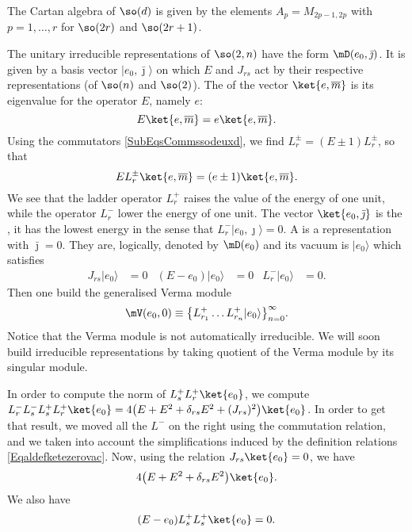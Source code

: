 The Cartan algebra of $\so(d)$ is given by the elements $A_p=M_{2p-1,2p}$ with $p=1,\ldots, r$ for $\so(2r)$ and $\so(2r+1)$. 

The unitary irreducible representations of $\so(2,n)$ have the form $\mD(e_0,\bar\jmath)$. It is given by a basis vector $| e_0,\bar\jmath \rangle$ on which $E$ and $J_{rs}$ act by their respective representations (of $\so(n)$ and $\so(2)$). The  of the vector $\ket{e,\overline{ m }}$ is its eigenvalue for the operator $E$, namely $e$:
\begin{equation}
	E\ket{e,\overline{ m }}=e\ket{e,\overline{ m }}.
\end{equation}
Using the commutators \eqref{SubEqsCommssodeuxd}, we find $L_r^{\pm}=(E\pm 1)L_r^{\pm}$, so that
\begin{equation}
	E L^{\pm}_r\ket{e,\overline{ m }} =(e\pm 1)\ket{e,\overline{ m }}.
\end{equation}
We see that the ladder operator $L_r^+$ raises the value of the energy of one unit, while the operator $L_r^-$ lower the energy of one unit. The vector $\ket{e_0,\bar\jmath}$ is the , it has the lowest energy in the sense that $L^{-}_r| e_0,\jmath \rangle=0$. A  is a representation with $\bar\jmath=0$. They are, logically, denoted by $\mD(e_0)$ and its vacuum is $| e_0 \rangle$ which satisfies
\begin{align}		\label{Eqaldefketezerovac}
	J_{rs}| e_0 \rangle & = 0	& (E-e_0)| e_0 \rangle&=0	&L_r^{-}| e_0 \rangle&=0.
\end{align}
Then one build the generalised Verma module
\begin{equation}	\label{EqmVVermaldots}
	\mV(e_0,0)\equiv \big\{   L_{r_1}^+\ldots L_{r_n}^+| e_0 \rangle   \big\}_{n=0}^{\infty}.
\end{equation}
Notice that the Verma module is not automatically irreducible. We will soon build irreducible representations by taking quotient of the Verma module by its singular module.

In order to compute the norm of $L_s^+L_r^+\ket{e_0}$, we compute $L^-_rL^-_sL^+_sL^+_r\ket{e_0} =4\big(E+E^2+\delta_{rs}E^2+(J_{rs})^2\big)\ket{e_0}$. In order to get that result, we moved all the $L^-$ on the right using the commutation relation, and we taken into account the simplifications induced by the definition relations \eqref{Eqaldefketezerovac}. Now, using the relation $J_{rs}\ket{e_0}=0$, we have
\begin{equation}
	4\big(E+E^2+\delta_{rs}E^2\big)\ket{e_0}.
\end{equation} We also have
\begin{equation}
	(E-e_0)L^+_sL^+_s\ket{e_0}=0.
\end{equation}


